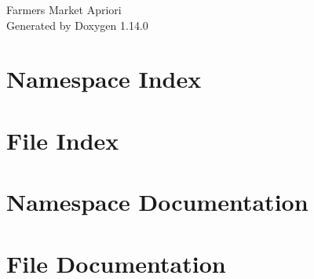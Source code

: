 \documentclass[twoside]{book}
\newcommand{\+}{\discretionary{\mbox{\scriptsize$\hookleftarrow$}}{}{}}
\newcommand{\clearemptydoublepage}{%
    \newpage{\pagestyle{empty}\cleardoublepage}%
  }
\begin{document}
  \raggedbottom
    \hypersetup{pageanchor=false,
                bookmarksnumbered=true,
                pdfencoding=unicode
               }
  \begin{titlepage}
  \vspace*{7cm}
  \begin{center}%
  {\Large Farmers Market Apriori}\\
  \vspace*{1cm}
  {\large Generated by Doxygen 1.14.0}\\
  \end{center}
  \end{titlepage}
  \clearemptydoublepage
  \tableofcontents
  \clearemptydoublepage
  \hypersetup{pageanchor=true}
\chapter{Namespace Index}

\chapter{File Index}

\chapter{Namespace Documentation}

\chapter{File Documentation}

  \backmatter
  \newpage
  \clearemptydoublepage
  \printindex
\end{document}
